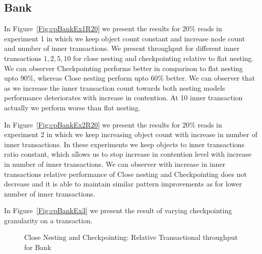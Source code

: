 \documentclass[12pt,english]{report}
\begin{document}
\subsection{Bank}
In Figure~\ref{Fig:cpBankEx1R20} we present the results for 20\% reads in experiment 1 in which we keep object count constant and increase node count and number of inner transactions. We present throughput for different inner transactions ${1, 2, 5, 10}$ for close nesting and checkpointing relative to flat nesting. We can observer Checkpointing performs better in comparison to flat nesting upto 90\%, whereas Close nesting perform upto 60\% better. We can observer that as we increase the inner transaction count towards both nesting models performance deteriorates with increase in contention. At 10 inner transaction actually we perform worse than flat nesting.

In Figure~\ref{Fig:cpBankEx2R20} we present the results for 20\% reads in experiment 2 in which we keep increasing object count with increase in number of inner transactions. In these experiments we keep objects to inner transactions ratio constant, which allows us to stop increase in contention level with increase in number of inner transactions. We can observer with increase in inner transactions relative performance of Close nesting and Checkpointing does not decrease and it is able to maintain similar pattern improvements as for lower number of inner transactions.

In Figure~\ref{Fig:cpBankEx3} we present the result of varying checkpointing granularity on a transaction.

\begin{figure}[H]
\centering
{}
\end{figure}
\begin{figure}[H]
\centering
{}
\end{figure}
\begin{figure}[H]
\centering
{}
\caption{Close Nesting and Checkpointing: Relative Transactional throughput for Bank}
\label{Fig:cpBank}
\end{figure}
\end{document}
